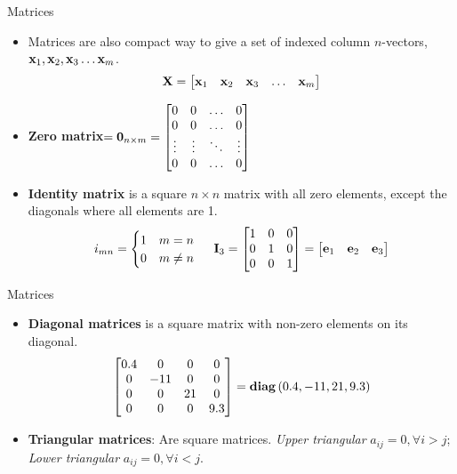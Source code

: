 \documentclass[aspectratio=169]{beamer}
\begin{document}
\begin{frame}[t]{Matrices}
  \begin{itemize}
    \item Matrices are also compact way to give a set of indexed column $n$-vectors, 
    $\mathbf{x}_1, \mathbf{x}_2, \mathbf{x}_3 \ldots \mathbf{x}_m$. 
    $$\mathbf{X} = \begin{bmatrix}
      \mathbf{x}_1 & \mathbf{x}_2 & \mathbf{x}_3 & \ldots & \mathbf{x}_m
    \end{bmatrix}$$
    
    \item \textbf{Zero matrix}$ = \mathbf{0}_{n\times m} = \begin{bmatrix}
      0 & 0 & \ldots & 0\\
      0 & 0 & \ldots & 0\\
      \vdots & \vdots & \ddots & \vdots\\
      0 & 0 & \ldots & 0
    \end{bmatrix}$
    
    \item \textbf{Identity matrix} is a square $n \times n$ matrix with all zero elements, except the diagonals where all elements are 1.
    $$i_{mn} = \begin{cases}
      1 & m = n\\
      0 & m \neq n
    \end{cases} \,\,\,\,\,\,\,\, \mathbf{I}_3=\begin{bmatrix}
      1 & 0 & 0\\
      0 & 1 & 0\\
      0 & 0 & 1\\
    \end{bmatrix} = \begin{bmatrix}
      \mathbf{e}_1 & \mathbf{e}_2 & \mathbf{e}_3
    \end{bmatrix}$$
  \end{itemize}
\end{frame}


\begin{frame}[t]{Matrices}
  \begin{itemize}
    
    \item \textbf{Diagonal matrices} is a square matrix with non-zero elements on its diagonal.
    $$\begin{bmatrix}
      0.4 & 0 & 0 & 0\\
      0 & -11 & 0 & 0\\
      0 & 0 & 21 & 0\\
      0 & 0 & 0 & 9.3\\
    \end{bmatrix} = \text{\textbf{diag}}\left(0.4, -11, 21, 9.3\right)$$
    \item \textbf{Triangular matrices}: Are square matrices. \textit{Upper triangular} $a_{ij} = 0, \forall i > j$; \textit{Lower triangular} $a_{ij} = 0, \forall i < j$.
  \end{itemize}
\end{frame}
\end{document}
